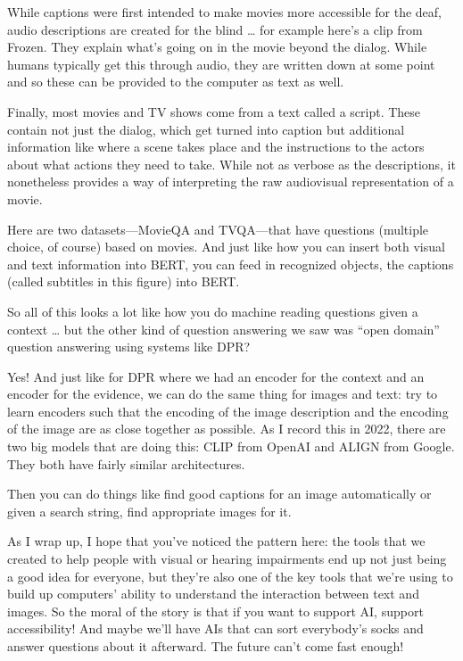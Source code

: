 While captions were first intended to make movies more accessible for the deaf, audio descriptions are created for the blind … for example here’s a clip from Frozen.  They explain what’s going on in the movie beyond the dialog.  While humans typically get this through audio, they are written down at some point and so these can be provided to the computer as text as well.

Finally, most movies and TV shows come from a text called a script.  These contain not just the dialog, which get turned into caption but additional information like where a scene takes place and the instructions to the actors about what actions they need to take.  While not as verbose as the descriptions, it nonetheless provides a way of interpreting the raw audiovisual representation of a movie.

Here are two datasets—MovieQA and TVQA—that have questions (multiple choice, of course) based on movies.  And just like how you can insert both visual and text information into BERT, you can feed in recognized objects, the captions (called subtitles in this figure) into BERT.

So all of this looks a lot like how you do machine reading questions given a context … but the other kind of question answering we saw was “open domain” question answering using systems like DPR?  

Yes!  And just like for DPR where we had an encoder for the context and an encoder for the evidence, we can do the same thing for images and text: try to learn encoders such that the encoding of the image description and the encoding of the image are as close together as possible.  As I record this in 2022, there are two big models that are doing this: CLIP from OpenAI and ALIGN from Google.  They both have fairly similar architectures.

Then you can do things like find good captions for an image automatically or given a search string, find appropriate images for it.

As I wrap up, I hope that you’ve noticed the pattern here: the tools that we created to help people with visual or hearing impairments end up not just being a good idea for everyone, but they’re also one of the key tools that we’re using to build up computers’ ability to understand the interaction between text and images.  So the moral of the story is that if you want to support AI, support accessibility!  And maybe we’ll have AIs that can sort everybody’s socks and answer questions about it afterward.  The future can’t come fast enough!

